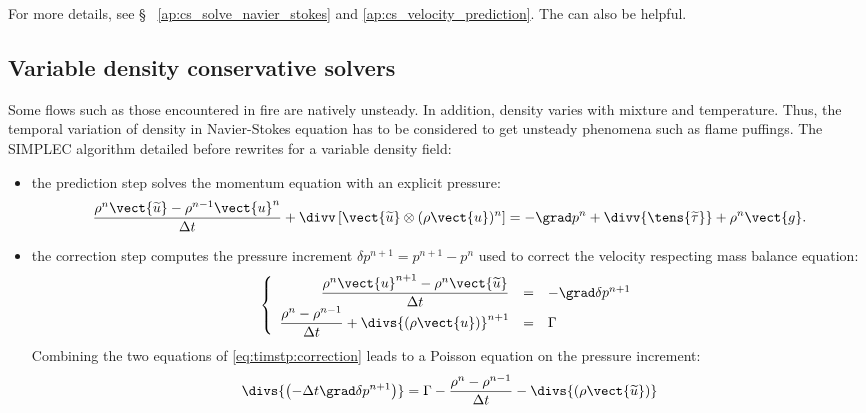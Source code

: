 For more details, see \S~ \ref{ap:cs_solve_navier_stokes} and \ref{ap:cs_velocity_prediction}. The  can also be helpful.



\subsection{Variable density conservative solvers}

Some flows such as those encountered in fire are natively unsteady.
In addition, density varies with mixture and temperature. Thus, the temporal
variation of density in Navier-Stokes equation has to be considered to get
unsteady phenomena such as flame puffings.
The SIMPLEC algorithm detailed before rewrites for a variable density field:

\begin{itemize}
 \item the prediction step solves the momentum equation with an explicit pressure:
%
\begin{equation}\label{eq:timstp:prediction}
\dfrac{\rho^n \vect{\widetilde{u}} - \rho^{n-1} \vect{u}^n}{\Delta t}
+ \divv \left[\vect{\widetilde{u}} \otimes (\rho \vect{u})^n \right] = -\grad p^n + \divv{\tens{\widetilde{\tau}}} + \rho^n\vect{g}.
\end{equation}

 \item the correction step computes the pressure increment $\delta p^{n+1} = p^{n+1} - p^n$
 used to correct the velocity respecting mass balance equation:
\begin{equation}
\left\{
  \begin{array}{r c l}
\dfrac{\rho^n \vect{u}^{n+1} - \rho^n\vect{\widetilde{u}}}{\Delta t} & = & -\grad \delta p^{n+1}\\
\dfrac{\rho^n - \rho^{n-1}}{\Delta t}+\divs{ \left(\rho \vect{u} \right)}^{n+1} & = & \Gamma
  \end{array}
\right.
\label{eq:timstp:correction}
\end{equation}
Combining the two equations of \eqref{eq:timstp:correction} leads to a Poisson equation on the pressure increment:
\begin{equation}
\divs{ \left( -\Delta t \grad \delta p^{n+1} \right) } = \Gamma
- \dfrac{\rho^n - \rho^{n-1}}{\Delta t} - \divs{ \left( \rho \vect{\widetilde{u}} \right) }
\end{equation}

\end{itemize}

